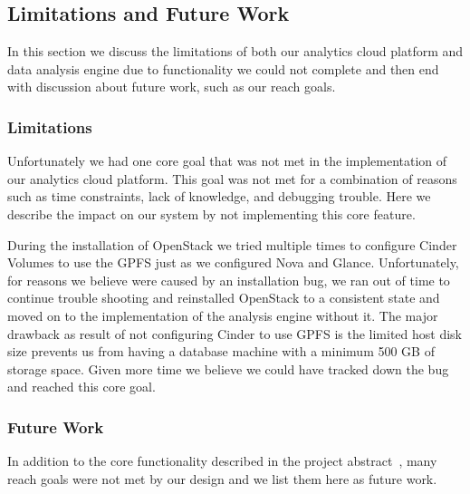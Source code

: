 \subsection{Limitations and Future Work}
\label{sec:limitations}

In this section we discuss the limitations of both our analytics cloud
platform and data analysis engine due to functionality we could not
complete and then end with discussion about future work, such as our
reach goals.

\subsubsection{Limitations}
Unfortunately we had one core goal that was not met in the implementation
of our analytics cloud platform. This goal was not met for a combination 
of reasons such as time constraints, lack of knowledge, and debugging
trouble. Here we describe the impact on our system by not implementing
this core feature.

During the installation of OpenStack we tried multiple times to configure
Cinder Volumes to use the GPFS just as we configured Nova and Glance.
Unfortunately, for reasons we believe were caused by an installation bug,
we ran out of time to continue trouble shooting and reinstalled OpenStack
to a consistent state and moved on to the implementation of the analysis
engine without it. The major drawback as result of not configuring Cinder
to use GPFS is the limited host disk size prevents us from having a
database machine with a minimum 500 GB of storage space. Given more time
we believe we could have tracked down the bug and reached this core
goal.

\subsubsection{Future Work}
In addition to the core functionality described in the project
abstract~\cite{abstract}, many reach goals were not met by our design
and we list them here as future work.


